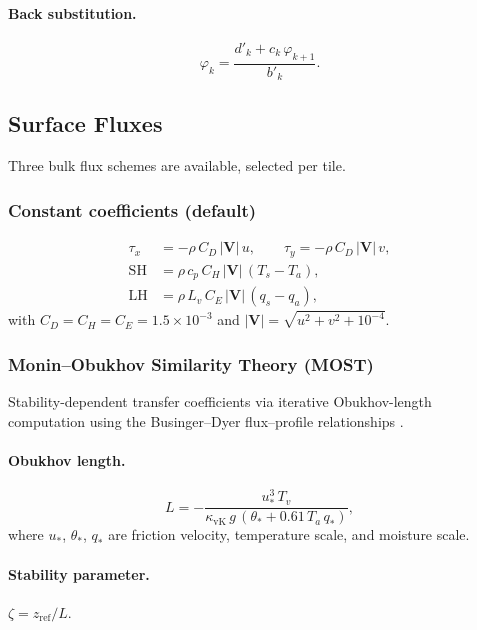 \documentclass[11pt,a4paper]{article}
\newcommand{\cpd}{c_p}
\newcommand{\Lv}{L_v}
\begin{document}
\paragraph{Back substitution.}
\begin{equation}
  \varphi_k = \frac{d'_k+c_k\,\varphi_{k+1}}{b'_k}.
\end{equation}

\subsection{Surface Fluxes}

Three bulk flux schemes are available, selected per tile.

\subsubsection{Constant coefficients (default)}
\begin{align}
  \tau_x &= -\rho\,C_D\,|\bm V|\,u, \qquad \tau_y = -\rho\,C_D\,|\bm V|\,v, \\
  \mathrm{SH} &= \rho\,\cpd\,C_H\,|\bm V|\,(T_s-T_a), \\
  \mathrm{LH} &= \rho\,\Lv\,C_E\,|\bm V|\,(q_s-q_a),
\end{align}
with $C_D=C_H=C_E=1.5\times10^{-3}$ and $|\bm V|=\sqrt{u^2+v^2+10^{-4}}$.

\subsubsection{Monin--Obukhov Similarity Theory (MOST)}

Stability-dependent transfer coefficients via iterative Obukhov-length computation using the Businger--Dyer flux--profile relationships \citep{Businger1971}.

\paragraph{Obukhov length.}
\begin{equation}
  L = -\frac{u_*^3\,T_v}{\kappa_{\mathrm{vK}}\,g\,(\theta_*+0.61\,T_a\,q_*)},
\end{equation}
where $u_*$, $\theta_*$, $q_*$ are friction velocity, temperature scale, and moisture scale.

\paragraph{Stability parameter.}  $\zeta=z_{\mathrm{ref}}/L$.
\end{document}
